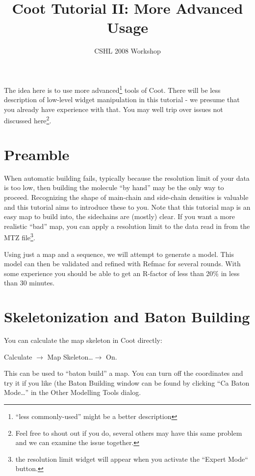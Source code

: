 \documentclass{article}
\title{Coot Tutorial II: More Advanced Usage}
\author{CSHL 2008 Workshop}
\begin{document}
\maketitle


   


The idea here is to use more advanced\footnote{``less commonly-used''
  might be a better description} tools of Coot.  There will be less
description of low-level widget manipulation in this tutorial - we
presume that you already have experience with that.  You may well trip
over issues not discussed here\footnote{Feel free to shout out if you
  do, several others may have this same problem and we can examine the
  issue together.}.

\section{Preamble}

When automatic building fails, typically because the resolution limit
of your data is too low, then building the molecule ``by hand'' may be
the only way to proceed.  Recognizing the shape of main-chain and
side-chain densities is valuable and this tutorial aims to introduce
these to you.  Note that this tutorial map is an easy map to build
into, the sidechains are (mostly) clear.  If you want a more realistic
``bad'' map, you can apply a resolution limit to the data read in from
the MTZ file\footnote{the resolution limit widget will appear when you
  activate the ``Expert Mode`` button.}.

Using just a map and a sequence, we will attempt to generate a model.
This model can then be validated and refined with Refmac for several
rounds.  With some experience you should be able to get an R-factor of
less than 20\% in less than 30 minutes.

\section{Skeletonization and Baton Building}


You can calculate the map skeleton in Coot directly:

\textsf{Calculate $\rightarrow$ Map Skeleton\ldots $\rightarrow$ On.}

This can be used to ``baton build'' a map.  You can turn off the
coordinates and try it if you like (the Baton Building window can be
found by clicking \textsf{``Ca Baton Mode\ldots''} in the Other
Modelling Tools dialog.
  
\end{document}
